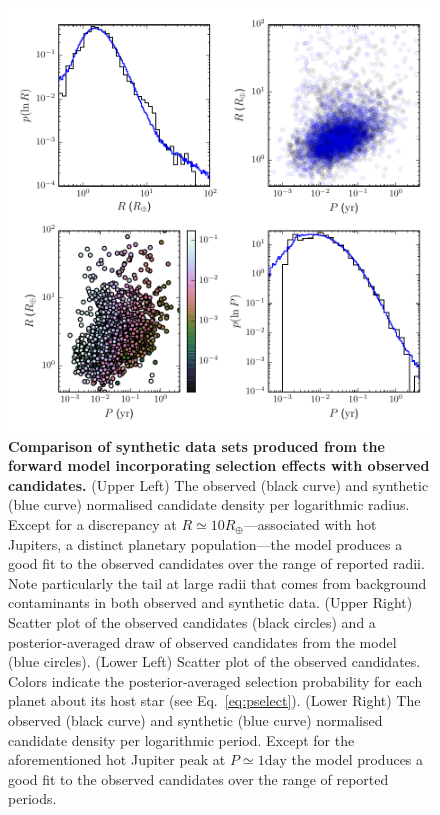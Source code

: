 \documentclass[12pt]{article}
\newcommand{\REarth}{R_\oplus}
\begin{document}
\begin{figure}
  \includegraphics[width=\columnwidth]{selection}
  \caption{\label{fig:selection} \textbf{Comparison of synthetic data
      sets produced from the forward model incorporating selection
      effects with observed candidates.}  (Upper Left) The observed
    (black curve) and synthetic (blue curve) normalised candidate
    density per logarithmic radius.  Except for a discrepancy at $R
    \simeq 10 \REarth$---associated with hot Jupiters, a distinct
    planetary population\cite{Albrecht2012,Naoz2012}---the model
    produces a good fit to the observed candidates over the range of
    reported radii.  Note particularly the tail at large radii that
    comes from background contaminants in both observed and synthetic
    data.  (Upper Right) Scatter plot of the observed candidates
    (black circles) and a posterior-averaged draw of observed
    candidates from the model (blue circles).  (Lower Left) Scatter
    plot of the observed candidates.  Colors indicate the
    posterior-averaged selection probability for each planet about its
    host star (see Eq.\ \eqref{eq:pselect}).  (Lower Right) The
    observed (black curve) and synthetic (blue curve) normalised
    candidate density per logarithmic period.  Except for the
    aforementioned hot Jupiter peak at $P \simeq 1 \mathrm{day}$ the
    model produces a good fit to the observed candidates over the
    range of reported periods.}
\end{figure}
\end{document}
